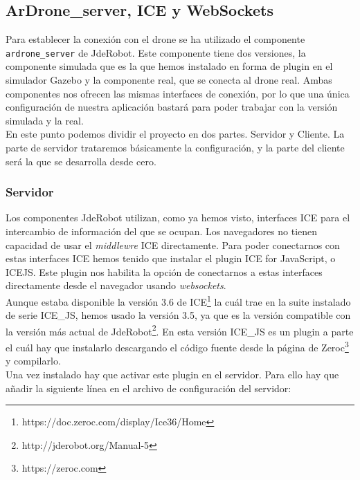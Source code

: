 \subsection{ArDrone\_server, ICE y WebSockets}\label{subsec:ardrone}

Para establecer la conexión con el drone se ha utilizado el componente \texttt{ardrone\_server} de JdeRobot. Este componente tiene dos versiones, la componente simulada que es la que hemos instalado en forma de plugin en el simulador Gazebo y la componente real, que se conecta al drone real. Ambas componentes nos ofrecen las mismas interfaces de conexión, por lo que una única configuración de nuestra aplicación bastará para poder trabajar con la versión simulada y la real.\\

En este punto podemos dividir el proyecto en dos partes. Servidor y Cliente. La parte de servidor trataremos básicamente la configuración, y la parte del cliente será la que se desarrolla desde cero.\\

\subsubsection{Servidor}

Los componentes JdeRobot utilizan, como ya hemos visto, interfaces ICE para el intercambio de información del que se ocupan. Los navegadores no tienen capacidad de usar el \emph{middlewre} ICE directamente. Para poder conectarnos con estas interfaces ICE hemos tenido que instalar el plugin ICE for JavaScript, o ICE\-JS. Este plugin nos habilita la opción de conectarnos a estas interfaces directamente desde el navegador usando \emph{websockets}.\\

Aunque estaba disponible la versión 3.6 de ICE\footnote{https://doc.zeroc.com/display/Ice36/Home} la cuál trae en la suite instalado de serie ICE\_JS, hemos usado la versión 3.5, ya que es la versión compatible con la versión más actual de JdeRobot\footnote{http://jderobot.org/Manual-5}. En esta versión ICE\_JS es un plugin a parte el cuál hay que instalarlo descargando el código fuente desde la página de Zeroc\footnote{https://zeroc.com} y compilarlo.\\

Una vez instalado hay que activar este plugin en el servidor. Para ello hay que añadir la siguiente línea en el archivo de configuración del servidor:\\

